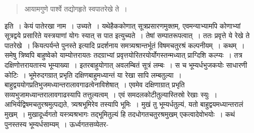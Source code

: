 \documentclass[11pt, openany]{book}
\begin{document}
\begin{quote}
{\qt आयामगुणे पार्श्वे तद्योगहृते स्वपातरेखे ते~।}
\end{quote}

\noindent इति~। केयं पातेरखा नाम~। उच्यते~। यथेहैककोणात् सूत्रप्रसारणमुक्तम्, एवमन्याभ्यामपि कोणाभ्यां सूत्रद्वये प्रसारिते यस्त्रयाणां योगः स्यात् स पात इत्युच्यते~। तेषां सम्पातरूपत्वात्~। ततः प्रवृत्ते ये रेखे ते पातरेखे~। कियत्पर्यन्ते पुनस्ते इत्यादि प्रदर्शनाय समत्र्यश्रान्तर्भूतं विषमचतुरश्रं कल्पनीयम्~। कथम्~। समेषु त्रिष्वपि बाहुष्वेको याम्योत्तरायतः तदग्राभ्यां प्रवृत्तयोरितरयोर्योगस्तन्मध्यात् प्राग्दिशि कल्प्यः~। तत्र दक्षिणोत्तरायतास्य भूम्याख्या~। इतरबाहुयोगात् अवलम्बितं सूत्रं लम्बः~। स च भूम्यर्धभुजकयोः साधारणी कोटिः~। भूमेरुदगग्रात् प्रभृति दक्षिणबाहुमध्यान्तं या रेखा सापि लम्बतुल्या~। बाहुद्वययोगप्रतिभुजमध्यान्तरालावगाढत्वेनाविशेषात्~। एवमेव दक्षिणाग्रात् प्रभृति सव्यभुजामध्यान्तरालावगाढस्यापि तत्तुल्यत्वम्~। एवं समदलकोटीतुल्यास्तिस्रो रेखाः स्युः~। आभिर्यद्विषमचतुरश्रमुत्पद्यते,
त्र्यश्रभूमिरेव तस्यापि भूमिः~। मुखं तु भूम्यर्धतुल्यं, यतो बाहुद्वयमध्यान्तरालं मुखम्~। मुखादूर्ध्वगतो यस्त्र्यश्रभागः तद्भूमितुल्यं हि तदधोगतचतुरश्रमुखम् एकत्वादेवोभयोः~। कथं पुनस्तस्य भूम्यर्धसाम्यम्~। ऊर्ध्वगतसव्येतर-
\end{document}
